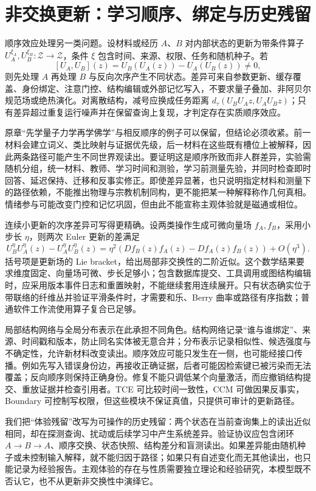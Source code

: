 \section{非交换更新：学习顺序、绑定与历史残留}
\label{sec:quantum_magnetic}

顺序效应处理另一类问题。设材料或经历 $A$、$B$ 对内部状态的更新为带条件算子 $U_A^{\xi_A},U_B^{\xi_B}:\mathcal Z\to\mathcal Z$，条件 $\xi$ 包含时间、来源、权限、任务和随机种子。若
\[
[U_A,U_B](z)=U_B(U_A(z))-U_A(U_B(z))\neq0,
\]
则先处理 $A$ 再处理 $B$ 与反向次序产生不同状态。差异可来自参数更新、缓存覆盖、身份绑定、注意门控、结构编辑或外部记忆写入，不要求量子叠加、非阿贝尔规范场或绝热演化。对离散结构，减号应换成任务距离 $d_\tau(U_BU_Az,U_AU_Bz)$；只有差异超过重复运行噪声并在保留查询上复现，才判定存在实质顺序效应。

原章“先学量子力学再学佛学”与相反顺序的例子可以保留，但结论必须收紧。前一材料会建立词义、类比映射与证据优先级，后一材料在这些既有槽位上被解释，因此两条路径可能产生不同世界观读出。要证明这是顺序所致而非人群差异，实验需随机分组，统一材料、教师、学习时间和测验，学习前测量先验，并同时检查即时回答、延迟保持、迁移和反事实修正。即使差异显著，也只说明指定材料和测量下的路径依赖，不能推出物理与宗教机制同构，更不能把某一种解释称作几何真相。情绪参与可能改变门控和记忆巩固，但由此不能宣称主观体验就是磁通或相位。

连续小更新的次序差异可写得更精确。设两类操作生成可微向量场 $f_A,f_B$，采用小步长 $\eta$，则两次 Euler 更新的差满足
\[
U_B^\eta U_A^\eta(z)-U_A^\eta U_B^\eta(z)
=\eta^2(Df_B(z)f_A(z)-Df_A(z)f_B(z))+O(\eta^3).
\]
括号项是更新场的 Lie bracket，给出局部非交换性的二阶近似。这个数学结果要求维度固定、向量场可微、步长足够小；包含数据库提交、工具调用或图结构编辑时，应采用版本事件日志和重置映射，不能继续套用连续展开。只有状态确实位于带联络的纤维丛并验证平滑条件时，才需要和乐、Berry 曲率或路径有序指数；普通软件工作流使用算子复合已足够。

局部结构网络与全局分布表示在此承担不同角色。结构网络记录“谁与谁绑定”、来源、时间戳和版本，防止同名实体被无意合并；分布表示记录相似性、候选强度与不确定性，允许新材料改变读出。顺序效应可能只发生在一侧，也可能经接口传播。例如先写入错误身份边，再接收正确证据，后者可能因检索键已被污染而无法覆盖；反向顺序则保持正确身份。修复不能只调低某个向量激活，而应撤销结构提交、重放证据并检查引用者。TCE 可比较时间一致性，CCM 可做因果反事实，Boundary 可控制写权限，但这些模块不保证真值，只提供可审计的更新路径。

我们把“体验残留”改写为可操作的历史残留：两个状态在当前查询集上的读出近似相同，却在探测查询、扰动或后续学习中产生系统差异。验证协议应包含闭环 $A\to B\to A$、顺序交换、状态快照、结构差分和盲测读出。如果差异能由随机种子或未控制输入解释，就不能归因于路径；如果只有自述变化而无其他读出，也只能记录为经验报告。主观体验的存在与性质需要独立理论和经验研究，本模型既不否认它，也不从更新非交换性中演绎它。

